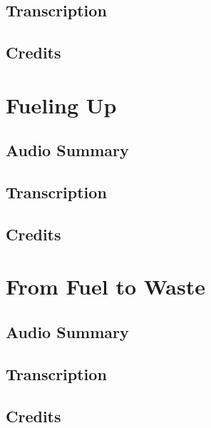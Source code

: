 \subsection{Transcription}

\subsection{Credits}

\section{Fueling Up}

\subsection{Audio Summary}

\subsection{Transcription}

\subsection{Credits}

\section{From Fuel to Waste}

\subsection{Audio Summary}

\subsection{Transcription}

\subsection{Credits}